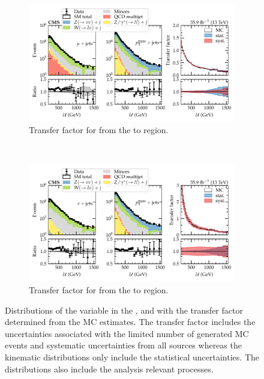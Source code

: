 \begin{figure}[htb]
    \centering
    \begin{subfigure}[b]{\textwidth}
        \centering
        \includegraphics{chapters/042_backgrounds/images/tf_mu_sr.pdf}
        \caption{Transfer factor for \IWj from the \muplusjets to \metplusjets region.}
        \label{subfiga:tfs_emu_sr}
    \end{subfigure}
    \\
    \begin{subfigure}[b]{\textwidth}
        \centering
        \includegraphics{chapters/042_backgrounds/images/tf_e_sr.pdf}
        \caption{Transfer factor for \IWj from the \eleplusjets to \metplusjets region.}
        \label{subfigb:tfs_emu_sr}
    \end{subfigure}
    \caption[Muon and electron transfer factors into the signal region]{
        Distributions of the \recoil variable in the \muplusjets, \eleplusjets and \metplusjets with the transfer factor determined from the \IWj MC estimates. The transfer factor includes the uncertainties associated with the limited number of generated MC events and systematic uncertainties from all sources whereas the kinematic distributions only include the statistical uncertainties. The distributions also include the analysis relevant processes.
    }
    \label{fig:tfs_emu_sr}
\end{figure}

